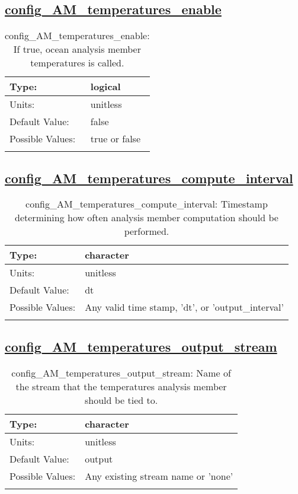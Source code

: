 \subsection[config\_AM\_temperatures\_enable]{\hyperref[sec:nm_tab_AM_temperatures]{config\_AM\_temperatures\_enable}}
\label{subsec:nm_sec_config_AM_temperatures_enable}
\begin{center}
\begin{longtable}{| p{2.0in} || p{4.0in} |}
    \hline
    Type: & logical \\
    \hline
    Units: & \si{unitless} \\
    \hline
    Default Value: & false \\
    \hline
    Possible Values: & true or false \\
    \hline
    \caption{config\_AM\_temperatures\_enable: If true, ocean analysis member temperatures is called.}
\end{longtable}
\end{center}
\subsection[config\_AM\_temperatures\_compute\_interval]{\hyperref[sec:nm_tab_AM_temperatures]{config\_AM\_temperatures\_compute\_interval}}
\label{subsec:nm_sec_config_AM_temperatures_compute_interval}
\begin{center}
\begin{longtable}{| p{2.0in} || p{4.0in} |}
    \hline
    Type: & character \\
    \hline
    Units: & \si{unitless} \\
    \hline
    Default Value: & dt \\
    \hline
    Possible Values: & Any valid time stamp, 'dt', or 'output\_interval' \\
    \hline
    \caption{config\_AM\_temperatures\_compute\_interval: Timestamp determining how often analysis member computation should be performed.}
\end{longtable}
\end{center}
\subsection[config\_AM\_temperatures\_output\_stream]{\hyperref[sec:nm_tab_AM_temperatures]{config\_AM\_temperatures\_output\_stream}}
\label{subsec:nm_sec_config_AM_temperatures_output_stream}
\begin{center}
\begin{longtable}{| p{2.0in} || p{4.0in} |}
    \hline
    Type: & character \\
    \hline
    Units: & \si{unitless} \\
    \hline
    Default Value: & output \\
    \hline
    Possible Values: & Any existing stream name or 'none' \\
    \hline
    \caption{config\_AM\_temperatures\_output\_stream: Name of the stream that the temperatures analysis member should be tied to.}
\end{longtable}
\end{center}
